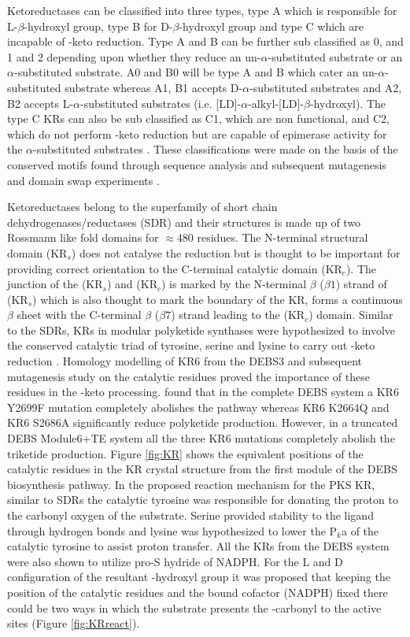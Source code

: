 			Ketoreductases can be classified into three types, type A which is responsible for L-$ \beta $-hydroxyl group, type B for D-$ \beta $-hydroxyl group and type C which are incapable of \bet-keto reduction. Type A and B can be further sub classified as 0, and 1 and 2 depending upon whether they reduce an un-$\alpha$-substituted substrate or an $\alpha$-substituted substrate. A0 and B0 will be type A and B which cater an un-$\alpha$-substituted substrate whereas A1, B1 accepts D-$\alpha$-substituted substrates and A2, B2 accepts L-$\alpha$-substituted substrates  (i.e. [LD]-$ \alpha $-alkyl-[LD]-$ \beta $-hydroxyl). The type C KRs can also be sub classified as C1, which are non functional, and C2, which do not perform \bet-keto reduction but are capable of epimerase activity for the $\alpha$-substituted substrates \parencite{Keatinge-Clay2007}. These classifications were made on the basis of the conserved motifs found through sequence analysis and subsequent mutagenesis and domain swap experiments \parencite{Caffrey2003, Zheng2011}. 
			
			Ketoreductases belong to the superfamily of short chain dehydrogenases/reductases (SDR) and their structures is made up of two Rossmann like fold domains for $\approx$480 residues. The N-terminal structural domain (KR$ _{s} $) does not catalyse the reduction but is thought to be important for providing correct orientation to the C-terminal catalytic domain (KR$_{ c} $). The junction of the  (KR$ _{s} $) and (KR$_{ c} $) is marked by the N-terminal $ \beta $ ($ \beta1 $) strand of (KR$ _{s} $) which is also thought to mark the boundary of the KR, forms a continuous $ \beta $ sheet with the C-terminal $ \beta $ ($ \beta7 $) strand leading to the (KR$_{ c} $) domain. Similar to the SDRs, KRs in modular polyketide synthases were hypothesized to involve the conserved catalytic triad of tyrosine, serine and lysine to carry out \bet-keto reduction \parencite{Keatinge-Clay2006, Zheng2011}. Homology modelling of KR6 from the DEBS3 and subsequent mutagenesis study on the catalytic residues proved the importance of these residues in the \bet-keto processing. \textcite{Reid2003} found that in the complete DEBS system a KR6 Y2699F mutation completely abolishes the pathway whereas KR6 K2664Q and KR6 S2686A significantly reduce polyketide production. However, in a truncated DEBS Module6+TE system all the three KR6 mutations completely abolish the triketide production. Figure \ref{fig:KR} shows the equivalent positions of the catalytic residues in the KR crystal structure from the first module of the DEBS biosynthesis pathway. In the proposed reaction mechanism for the PKS KR, similar to SDRs the catalytic tyrosine was responsible for donating the proton to the carbonyl oxygen of the substrate. Serine provided stability to the ligand through hydrogen bonds and lysine was hypothesized to lower the P$ _{k} $a of the catalytic tyrosine to assist proton transfer. All the KRs from the DEBS system were also shown to utilize pro-S hydride of NADPH. For the L and D configuration of the resultant \bet-hydroxyl group it was proposed that keeping the position of the catalytic residues and the bound cofactor (NADPH) fixed there could be two ways in which the substrate presents the \bet-carbonyl to the active sites (Figure \ref{fig:KRreact}). 

